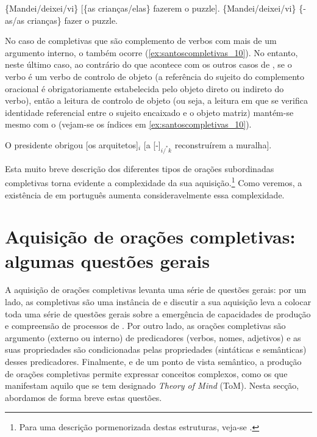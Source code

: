 \documentclass[output=paper]{LSP/langsci}
\begin{document}
\ea\label{ex:santoscompletivas_9}
\ea\label{ex:santoscompletivas_9a} \{Mandei/deixei/vi\} [\{as crianças/elas\} fazerem o puzzle].
\ex\label{ex:santoscompletivas_9b} \{Mandei/deixei/vi\}  \{-as/as crianças\} fazer o puzzle.
\zl

No caso de completivas que são complemento de verbos com mais de um argumento interno, o  também ocorre (\ref{ex:santoscompletivas_10}). No entanto, neste último caso, ao contrário do que acontece com os outros casos de , se o verbo é um verbo de controlo de objeto (a referência do sujeito do complemento oracional é obrigatoriamente estabelecida pelo objeto direto ou indireto do verbo), então a leitura de controlo de objeto (ou seja, a leitura em que se verifica identidade referencial entre o sujeito encaixado e o objeto matriz) mantém-se mesmo com o  (vejam-se os índices em \ref{ex:santoscompletivas_10}). 

\ea\label{ex:santoscompletivas_10}
O presidente obrigou [os arquitetos]$_i$ [a [-]$_{i/^{*}k}$ reconstruírem a muralha].
\z

Esta muito breve descrição dos diferentes tipos de orações subordinadas completivas torna evidente a complexidade da sua aquisição.\footnote{Para uma descrição pormenorizada destas estruturas, veja-se \citealt{duarte2003}.} Como veremos, a existência de  em português aumenta consideravelmente essa complexidade.

\section{Aquisição de orações completivas: algumas questões gerais}
\label{sec:santoscompletivas_questoes_gerais}

A aquisição de orações completivas levanta uma série de questões gerais: por um lado, as completivas são uma instância de  e discutir a sua aquisição leva a colocar toda uma série de questões gerais sobre a emergência de capacidades de produção e compreensão de processos de . Por outro lado, as orações completivas são argumento (externo ou interno) de predicadores (verbos, nomes, adjetivos) e as suas propriedades são condicionadas pelas propriedades (sintáticas e semânticas) desses predicadores. Finalmente, e de um ponto de vista semântico, a produção de orações completivas permite expressar conceitos complexos, como os que manifestam aquilo que se tem designado \textit{Theory of Mind} (ToM). Nesta secção, abordamos de forma breve estas questões.
\end{document}
